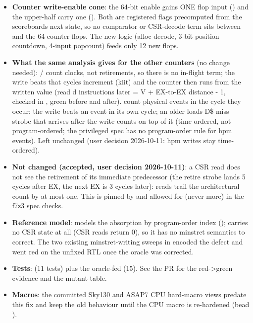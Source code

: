 \begin{record}
\begin{itemize}
  two stages past EX and EX-to-EX spacing is \textgreater= 3, so no
  younger writer has executed when a trap is taken and every pending
  writer is older and still retires (clearing on trap entry is
  behaviourally equivalent in this pipeline: mutant M10 survives).
\item
  \textbf{Counter write-enable cone}: the 64-bit  enable
  gains ONE flop input () and the upper-half carry one
  (). Both are registered flags precomputed from
  the scoreboard\textquotesingle s next state, so no comparator or
  CSR-decode term sits between  and the 64 counter flops.
  The new logic (alloc decode, 3-bit position countdown,
   4-input popcount) feeds only 12 new flops.
\item
  \textbf{What the same analysis gives for the other counters} (no
  change needed): / count clocks, not
  retirements, so there is no in-flight term; the write beats that
  cycle\textquotesingle s increment (kiit) and the counter then runs
  from the written value (read d instructions later = V + EX-to-EX
  distance - 1, checked in ,
  green before and after).  count physical events
  in the cycle they occur: the write beats an event in its own cycle; an
  older load\textquotesingle s D\$ miss strobe that arrives after the
  write counts on top of it (time-ordered, not program-ordered; the
  privileged spec has no program-order rule for hpm events). Left
  unchanged (user decision 2026-10-11: hpm writes stay time-ordered).
\item
  \textbf{Not changed (accepted, user decision 2026-10-11)}: a CSR read
  does not see the retirement of its immediate predecessor (the retire
  strobe lands 5 cycles after EX, the next EX is 3 cycles later):
   reads trail the architectural count by at most one. This
  is pinned by 
  and allowed for (never more) in the f7z3 spec checks.
\item
  \textbf{Reference model}: 
   models the absorption by program-order index
  ();  carries no CSR
  state at all (CSR reads return 0), so it has no minstret semantics to
  correct. The two existing minstret-writing sweeps in
   encoded the defect and went red on the unfixed
  RTL once the oracle was corrected.
\item
  \textbf{Tests}:  (11 tests)
  plus the oracle-fed  (15). See the PR for the
  red-\textgreater green evidence and the mutant table.
\item
  \textbf{Macros}: the committed Sky130 and ASAP7 CPU hard-macro views
  predate this fix and keep the old behaviour until the CPU macro is
  re-hardened (bead ).
\end{itemize}


\end{record}
